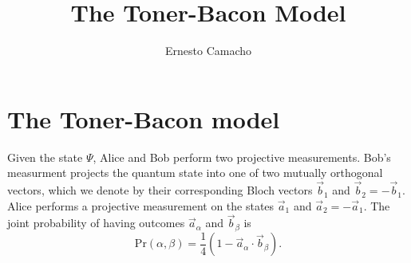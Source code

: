 \documentclass[a4paper]{article}
\title{The Toner-Bacon Model}
\author{Ernesto Camacho}
\begin{document}
    \maketitle

    \section{The Toner-Bacon model}

    Given the state $\Psi$, Alice and Bob perform two
    projective measurements. Bob's measurment projects the
    quantum state into one of two mutually orthogonal
    vectors, which we denote by their corresponding Bloch
    vectors $\vec b_1$ and $\vec b_2 = -\vec b_1$. Alice
    performs a projective measurement on the states $\vec
    a_1$ and $\vec a_2 = -\vec a_1$. The joint probability
    of having outcomes $\vec a_\alpha$ and $\vec b_\beta$ is
    \begin{equation}
        \text{Pr}(\alpha,\beta)
        = \frac{1}{4}(1 - \vec a_\alpha \cdot \vec b_\beta).
    \end{equation}
\end{document}
